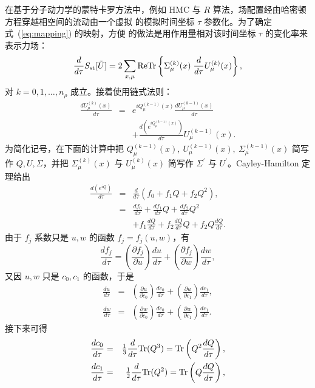 在基于分子动力学的蒙特卡罗方法中，例如 HMC\cite{hmc} 与
$R$ 算法\cite{Ralgorithm}，场配置经由哈密顿方程穿越相空间的流动由一个虚拟
的模拟时间坐标 $\tau$ 参数化。为了确定式~(\ref{eq:mapping}) 的映射，方便
的做法是用作用量相对该时间坐标 $\tau$ 的变化率来表示力场：
\begin{equation}
  \frac{d}{d\tau}S_{\rm st}[\tilde{U}] = 2\sum_{x,\mu} \mbox{ReTr} \left\{
        \Sigma_\mu^{(k)}(x)   \;
        \frac{d}{d\tau} U^{(k)}_\mu(x)
\right\},
\end{equation}
对 $k=0,1,\dots,n_\rho$ 成立。接着使用链式法则：
\begin{eqnarray}
\frac{dU^{(k)}_\mu(x)}{d\tau} &=&  e^{i Q^{(k-1)}_\mu(x)}
   \frac{dU^{(k-1)}_\mu(x)}{d\tau} \nonumber\\
   &&+ \frac{d(e^{i Q^{(k-1)}_\mu(x)})}{d\tau} U^{(k-1)}_\mu(x).
\end{eqnarray}
为简化记号，在下面的计算中把
$Q^{(k-1)}_\mu(x),\ U^{(k-1)}_\mu(x),\ \Sigma^{(k-1)}_\mu(x)$
简写作 $Q,U,\Sigma$，并把 $\Sigma^{(k)}_\mu(x)$ 与 $U^{(k)}_\mu(x)$ 简写作
$\Sigma^\prime$ 与 $U^\prime$。Cayley-Hamilton 定理给出
\begin{eqnarray}
    \frac{d(e^{i Q})}{d\tau} &=& \frac{d}{d\tau}
             \left(f_0 + f_1 Q + f_2 Q^2\right),\nonumber\\
   &=& \frac{df_0}{d\tau}+\frac{df_1}{d\tau}Q+\frac{df_2}{d\tau}Q^2\nonumber\\
    &&   + f_1\frac{dQ}{d\tau}+f_2\frac{dQ}{d\tau}Q+f_2Q\frac{dQ}{d\tau}.
\end{eqnarray}
由于 $f_j$ 系数只是 $u,w$ 的函数 $f_j=f_j(u,w)$，有
\begin{equation}
    \frac{df_j}{d\tau} = \left(\frac{\partial f_j}{\partial u}\right)
   \frac{du}{d\tau}
    + \left(\frac{\partial f_j}{\partial w}\right)
   \frac{dw}{d\tau},
\end{equation}
又因 $u,w$ 只是 $c_0,c_1$ 的函数，于是
\begin{eqnarray}
 \frac{du}{d\tau} &=& \left(\frac{\partial u}{\partial c_0}\right)
   \frac{dc_0}{d\tau}
                     +\left(\frac{\partial u}{\partial c_1}\right)
   \frac{dc_1}{d\tau},\\
 \frac{dw}{d\tau} &=& \left(\frac{\partial w}{\partial c_0}\right)
    \frac{dc_0}{d\tau}
                     +\left(\frac{\partial w}{\partial c_1}\right)
   \frac{dc_1}{d\tau}.
\end{eqnarray}
接下来可得
\begin{eqnarray}
    \frac{dc_0}{d\tau} &=& {\textstyle\frac{1}{3}}
    \frac{d}{d\tau} \mbox{Tr}(Q^3) =
 \mbox{Tr}\left(Q^2 \frac{dQ}{d\tau}\right),\\
    \frac{dc_1}{d\tau} &=& {\textstyle\frac{1}{2}}
   \frac{d}{d\tau} \mbox{Tr} (Q^2) =
\mbox{Tr}\left(Q \frac{dQ}{d\tau}\right),
\end{eqnarray}
